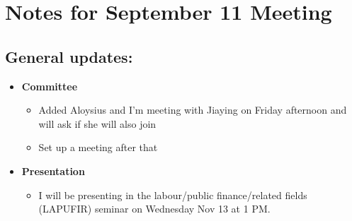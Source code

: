 \documentclass{article}
\begin{document}

\section*{Notes for September 11 Meeting}
\subsection*{General updates:}

\begin{itemize}
\item \textbf{Committee}
\begin{itemize}
\item Added Aloysius and I'm meeting with Jiaying on Friday afternoon and will ask if she will also join
\item Set up a meeting after that
\end{itemize}
\item \textbf{Presentation}
\begin{itemize}
	\item I will be presenting in the labour/public finance/related fields (LAPUFIR) seminar on Wednesday Nov 13 at 1 PM.
\end{itemize}
\end{itemize}
\end{document}
